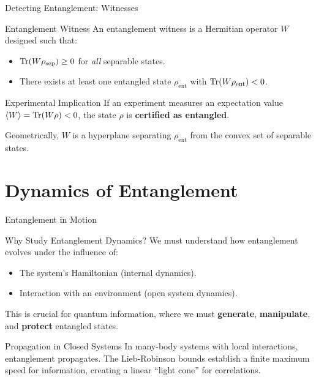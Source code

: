 \begin{frame}{Detecting Entanglement: Witnesses}
  \begin{block}{Entanglement Witness}
    An entanglement witness is a Hermitian operator $W$ designed such that:
    \begin{itemize}
      \item $\mathrm{Tr}(W \rho_{\text{sep}}) \ge 0$ for \emph{all} separable states.
      \pause
      \item There exists at least one entangled state $\rho_{\text{ent}}$ with
        $\mathrm{Tr}(W \rho_{\text{ent}}) < 0$.
    \end{itemize}
  \end{block}
  \pause
  \begin{alertblock}{Experimental Implication}
    If an experiment measures an expectation value $\braket{W} = \mathrm{Tr}(W \rho) <
    0$, the state $\rho$ is \textbf{certified as entangled}.
    \pause
    \begin{center}
    Geometrically, $W$ is a hyperplane separating $\rho_{\text{ent}}$ from
    the convex set of separable states.
    \end{center}
  \end{alertblock}
\end{frame}

\section{Dynamics of Entanglement}

\begin{frame}{Entanglement in Motion}
  \begin{block}{Why Study Entanglement Dynamics?}
    We must understand how entanglement evolves under the influence of:
    \begin{itemize}
      \item The system's Hamiltonian (internal dynamics).
      \item Interaction with an environment (open system dynamics).
    \end{itemize}
    \pause
    This is crucial for quantum information, where we must \textbf{generate},
    \textbf{manipulate}, and \textbf{protect} entangled states.
  \end{block}
  \pause
  \begin{alertblock}{Propagation in Closed Systems}
    In many-body systems with local interactions, entanglement propagates.
    The \alert{Lieb-Robinson bounds} establish a finite maximum speed for
    information, creating a linear ``light cone'' for correlations.
  \end{alertblock}
\end{frame}

